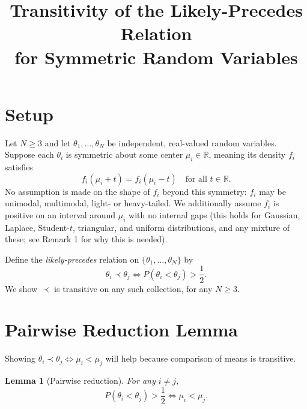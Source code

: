 \documentclass[11pt]{article}
\title{Transitivity of the Likely-Precedes Relation\\ for Symmetric Random Variables}
\author{}
\date{}
\newtheorem{lemma}{Lemma}
\begin{document}
\maketitle

\section{Setup}

Let $N \geq 3$ and let $\theta_1, \ldots, \theta_N$ be independent, real-valued random variables.
Suppose each $\theta_i$ is symmetric about some center $\mu_i \in \mathbb{R}$, meaning its density $f_i$ satisfies
\[
f_i(\mu_i + t) = f_i(\mu_i - t) \quad \text{for all } t \in \mathbb{R}.
\]
No assumption is made on the shape of $f_i$ beyond this symmetry: $f_i$ may be unimodal, multimodal, light- or heavy-tailed. We additionally assume $f_i$ is positive on an interval around $\mu_i$ with no internal gaps (this holds for Gaussian, Laplace, Student-$t$, triangular, and uniform distributions, and any mixture of these; see Remark 1 for why this is needed).

Define the \emph{likely-precedes} relation on $\{\theta_1, \ldots, \theta_N\}$ by
\[
\theta_i \prec \theta_j \iff P(\theta_i < \theta_j) > \frac{1}{2}.
\]
We show $\prec$ is transitive on any such collection, for any $N \geq 3$.

\section{Pairwise Reduction Lemma}

Showing $\theta_i \prec \theta_j \iff \mu_i < \mu_j$ will help because comparison of means is transitive.

\begin{lemma}[Pairwise reduction]
For any $i \neq j$,
\[
P(\theta_i < \theta_j) > \frac{1}{2} \iff \mu_i < \mu_j.
\]
\end{lemma}
\end{document}
